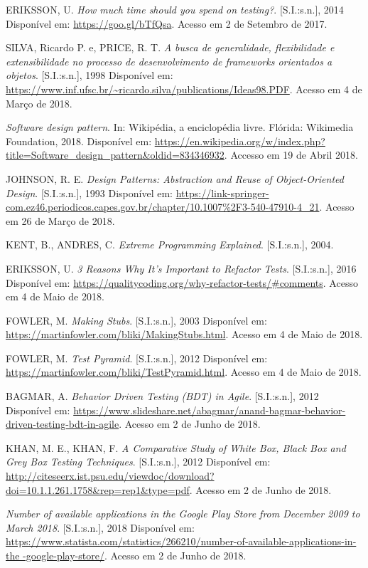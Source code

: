 \documentclass[
    12pt,       %
    openright,      %
    twoside,      %
    a4paper,      %
    english,      %
    french,       %
    spanish,      %
    brazil,       %
    ]{abntex2}
\begin{document}
  \noindent
  ERIKSSON, U. \textit{How much time should you spend on testing?}. [S.I.:s.n.], 2014 Disponível em:
  \url{https://goo.gl/bTfQsa}. Acesso em 2 de Setembro de 2017.

  \noindent
  SILVA, Ricardo P. e, PRICE, R. T. \textit{A busca de generalidade, flexibilidade e extensibilidade no processo de desenvolvimento de frameworks orientados a objetos}. [S.I.:s.n.], 1998 Disponível em: \url{https://www.inf.ufsc.br/~ricardo.silva/publications/Ideas98.PDF}. Acesso em 4 de Março de 2018.

  \noindent
  \textit{Software design pattern}. In: Wikipédia, a enciclopédia livre. Flórida: Wikimedia Foundation,
  2018. Disponível em:
  \url{https://en.wikipedia.org/w/index.php?title=Software_design_pattern&oldid=834346932}. Accesso
  em 19 de Abril 2018.

  \noindent
  JOHNSON, R. E. \textit{Design Patterns: Abstraction and Reuse of Object-Oriented Design}. [S.I.:s.n.], 1993 Disponível em: \url{https://link-springer-com.ez46.periodicos.capes.gov.br/chapter/10.1007%2F3-540-47910-4_21}. Acesso em 26 de Março de 2018.

  \noindent
  KENT, B., ANDRES, C. \textit{Extreme Programming Explained}. [S.I.:s.n.], 2004.

  \noindent
  ERIKSSON, U. \textit{3 Reasons Why It's Important to Refactor Tests}. [S.I.:s.n.], 2016 Disponível em:
  \url{https://qualitycoding.org/why-refactor-tests/#comments}. Acesso em 4 de Maio de 2018.

  \noindent
  FOWLER, M. \textit{Making Stubs}. [S.I.:s.n.], 2003 Disponível em:
  \url{https://martinfowler.com/bliki/MakingStubs.html}. Acesso em 4 de Maio de 2018.

  \noindent
  FOWLER, M. \textit{Test Pyramid}. [S.I.:s.n.], 2012 Disponível em:
  \url{https://martinfowler.com/bliki/TestPyramid.html}. Acesso em 4 de Maio de 2018.

  \noindent
  BAGMAR, A. \textit{Behavior Driven Testing (BDT) in Agile}. [S.I.:s.n.], 2012 Disponível em:
  \url{https://www.slideshare.net/abagmar/anand-bagmar-behavior-driven-testing-bdt-in-agile}. Acesso em 2 de Junho de 2018.

  \noindent
  KHAN, M. E., KHAN, F. \textit{A Comparative Study of White Box, Black Box and Grey Box Testing Techniques}. [S.I.:s.n.], 2012 Disponível em: \url{http://citeseerx.ist.psu.edu/viewdoc/download?doi=10.1.1.261.1758&rep=rep1&type=pdf}. Acesso em 2 de Junho de 2018.

  \noindent
  \textit{Number of available applications in the Google Play Store from December 2009 to March 2018}.
  [S.I.:s.n.], 2018 Disponível em: \url{https://www.statista.com/statistics/266210/number-of-available-applications-in-the -google-play-store/}. Acesso em 2 de Junho de 2018.
\end{document}
